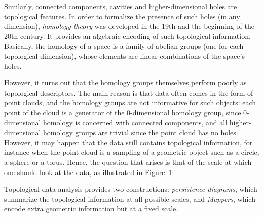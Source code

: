\begin{figure}
\begin{minipage}{.3\textwidth}
  \label{fig:scale}
\end{minipage}
\end{figure}

Similarly, connected components, cavities
and higher-dimensional holes are topological features. In order to formalize the presence of such holes (in any dimension), 
{\em homology theory} was developed in the 19th and the beginning of the 20th century. 
It provides an algebraic encoding of such topological information. 
Basically, the homology of a space is a family of abelian groups
(one for each topological dimension), whose elements are linear combinations of the space's holes.

However, it turns out that the homology groups themselves perform poorly as topological descriptors. The main reason
is that data often comes in the form of point clouds, and the homology groups are not informative for such objects:
each point of the cloud is a generator of the 0-dimensional homology group, since 0-dimensional homology is concerned with connected 
components, and all higher-dimensional homology groups are trivial since the point cloud has no holes.
However, it may happen that the data still contains topological information, 
for instance when the point cloud is a sampling of a geometric  object such as
a circle, a sphere or a torus. 
Hence, the question that arises is that of the scale at which one should look at the data,
as illustrated in Figure~\ref{fig:scale}.


Topological data analysis provides two constructions:    
{\em persistence diagrams}, which summarize the topological information at all possible scales, and {\em Mappers},
which encode extra geometric information but at a fixed scale.



